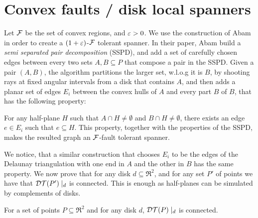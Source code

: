 \documentclass[12pt]{article}%
\begin{document}
	
\section{Convex faults / disk local spanners}

Let $\mathcal{F}$ be the set of convex regions, and $\varepsilon>0$. We use the
construction of Abam \etal \cite{abfg-rftgs-09} in order to create a
$(1+\varepsilon)$-$\mathcal{F}$ tolerant spanner. In their paper, Abam \etal build a
\emph{semi separated pair decomposition} (SSPD), and add a set of
carefully chosen edges between every two sets $A,B\subseteq P$ that
compose a pair in the SSPD. Given a pair $(A,B)$, the algorithm
partitions the larger set, w.l.o.g it is $B$, by shooting rays at
fixed angular intervals from a disk that contains $A$, and then adds a
planar set of edges $E_i$ between the convex hulls of $A$ and every
part $B$ of $B$, that has the following property:

For any half-plane $H$ such that $A\cap H\neq \emptyset$ and
$B\cap H\neq \emptyset$, there exists an edge $e\in E_i$ such that
$e\subseteq H$. This property, together with the properties of the
SSPD, makes the resulted graph an $\mathcal{F}$-fault tolerant spanner.

We notice, that a similar construction that chooses $E_i$ to be the
edges of the Delaunay triangulation with one end in $A$ and the other
in $B$ has the same property. We now prove that for any disk
$d\subseteq \Re^2$, and for any set $P'$ of points we have that
$\mathcal{DT}(P')\mid_d$ is connected. This is enough as half-planes can be
simulated by complements of disks.

\begin{claim}
    For a set of points $P\subseteq \Re^2$ and for any disk $d$,
    $\mathcal{DT}(P)\mid_d$ is connected.
\end{claim}
\end{document}
